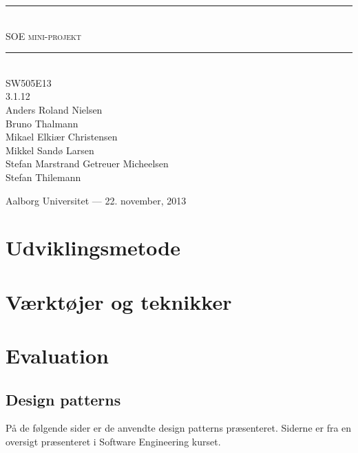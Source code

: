 



\begin{titlepage}
\newcommand{\HRule}{\rule{\linewidth}{0.5mm}}

\begin{center}

\HRule \\[0.5cm]
\textsc{ \Huge SOE mini-projekt}\\[0.3cm]

\HRule \\[1cm]

\textsc{\Large SW505E13 \\ 3.1.12}\\[0.5cm]

{\large
Anders Roland Nielsen \\
Bruno Thalmann \\
Mikael Elkiær Christensen \\
Mikkel Sandø Larsen \\
Stefan Marstrand Getreuer Micheelsen \\
Stefan Thilemann
}

\vfill

{\large Aalborg Universitet --- 22. november, 2013}

\end{center}

\end{titlepage}

\tableofcontents

\chapter{Udviklingsmetode}\label{udviklingsmetode}

\chapter{Værktøjer og teknikker}

\chapter{Evaluation}



\begin{appendices}
\chapter{Design patterns}
\label{appendix:patterns}
På de følgende sider er de anvendte design patterns præsenteret.
Siderne er fra en oversigt præsenteret i Software Engineering kurset.

\end{appendices}

